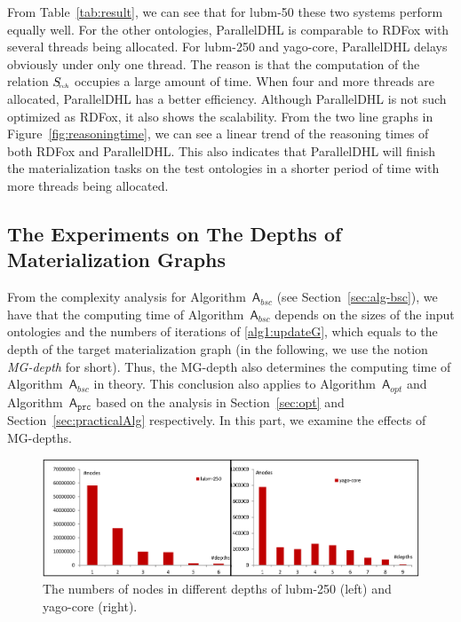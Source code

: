 From Table~\ref{tab:result}, we can see that for lubm-50 these two systems perform equally well.
For the other ontologies, ParallelDHL is comparable to RDFox with several threads being allocated.
For lubm-250 and yago-core, ParallelDHL delays obviously under only one thread.
The reason is that the computation of the relation $S_{\textit{\!\tiny rch}}$ occupies a large amount of time. When
four and more threads are allocated, ParallelDHL has a better efficiency.
Although ParallelDHL is not such optimized as RDFox, it also shows the scalability.
From the two line graphs in Figure~\ref{fig:reasoningtime},
we can see a linear trend of the reasoning times of both RDFox and ParallelDHL.
This also indicates that ParallelDHL will finish the materialization tasks on the test ontologies
in a shorter period of time with more threads being allocated.

\subsection{The Experiments on The Depths of Materialization Graphs}

From the complexity analysis for Algorithm~$\mathsf{A}_{bsc}$ (see Section~\ref{sec:alg-bsc}),
we have that the computing time of
Algorithm~$\mathsf{A}_{bsc}$ depends on the sizes of the input ontologies and the
numbers of iterations of \ref{alg1:updateG},
which equals to the depth of the target materialization graph (in the following,
we use the notion \emph{MG-depth} for short).
Thus, the MG-depth also determines the computing time of
Algorithm~$\mathsf{A}_{bsc}$ in theory.
This conclusion also applies to Algorithm~$\mathsf{A}_{opt}$ and Algorithm~$\mathsf{A}_{\texttt{prc}}$
based on the analysis in Section~\ref{sec:opt} and Section~\ref{sec:practicalAlg} respectively.
In this part, we examine the effects of MG-depths.

\begin{figure}[htbp]
\begin{center}
\includegraphics[width=1\textwidth]{fig-graphdepth.eps}
\caption{The numbers of nodes in different depths of lubm-250 (left) and yago-core (right).}
\label{fig:graphdepth}
\end{center}
\end{figure}

